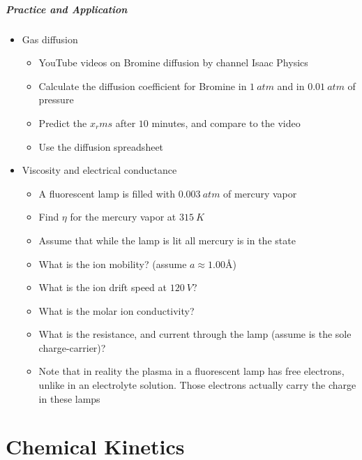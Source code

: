 \documentclass[12pt, openany, letterpaper]{memoir}
\begin{document}
\paragraph*{Practice and Application}
\begin{itemize}
	\item Gas diffusion
	      \begin{itemize}
		      \item YouTube videos on Bromine diffusion by channel Isaac Physics
		      \item Calculate the diffusion coefficient for Bromine in $1~atm$ and in $0.01~atm$ of pressure
		      \item Predict the $x_rms$ after $10$ minutes, and compare to the video
		      \item Use the diffusion spreadsheet
	      \end{itemize}
	\item Viscosity and electrical conductance
	      \begin{itemize}
		      \item A fluorescent lamp is filled with $0.003~atm$ of mercury vapor
		      \item Find $\eta$ for the mercury vapor at $315~K$
		      \item Assume that while the lamp is lit all mercury is in the  state
		      \item What is the ion mobility? (assume $a\approx1.00$\AA)
		      \item What is the ion drift speed at $120~V$?
		      \item What is the molar ion conductivity?
		      \item What is the resistance, and current through the lamp (assume  is the sole charge-carrier)?
		      \item Note that in reality the plasma in a fluorescent lamp has free electrons, unlike in an electrolyte solution. Those electrons actually carry the charge in these lamps
	      \end{itemize}
\end{itemize}

\chapter{Chemical Kinetics}
\end{document}

